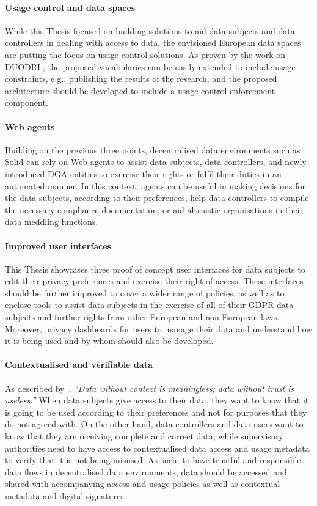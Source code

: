 \paragraph{Usage control and data spaces} While this Thesis focused on building solutions to aid data subjects and data controllers in dealing with access to data, the envisioned European data spaces are putting the focus on usage control solutions. As proven by the work on DUODRL, the proposed vocabularies can be easily extended to include usage constraints, e.g., publishing the results of the research, and the proposed architecture should be developed to include a usage control enforcement component.

\paragraph{Web agents} Building on the previous three points, decentralised data environments such as Solid can rely on Web agents to assist data subjects, data controllers, and newly-introduced DGA entities to exercise their rights or fulfil their duties in an automated manner. In this context, agents can be useful in making decisions for the data subjects, according to their preferences, help data controllers to compile the necessary compliance documentation, or aid altruistic organisations in their data meddling functions.

\paragraph{Improved user interfaces} This Thesis showcases three proof of concept user interfaces for data subjects to edit their privacy preferences and exercise their right of access. These interfaces should be further improved to cover a wider range of policies, as well as to enclose tools to assist data subjects in the exercise of all of their GDPR data subjects and further rights from other European and non-European laws. Moreover, privacy dashboards for users to manage their data and understand how it is being used and by whom should also be developed.

\paragraph{Contextualised and verifiable data} As described by~\cite{verborgh_rawdata_2023}, \textit{``Data without context is meaningless; data without trust is useless.''} When data subjects give access to their data, they want to know that it is going to be used according to their preferences and not for purposes that they do not agreed with. On the other hand, data controllers and data users want to know that they are receiving complete and correct data, while supervisory authorities need to have access to contextualised data access and usage metadata to verify that it is not being misused. As such, to have trustful and responsible data flows in decentralised data environments, data should be accessed and shared with accompanying access and usage policies as well as contextual metadata and digital signatures.

